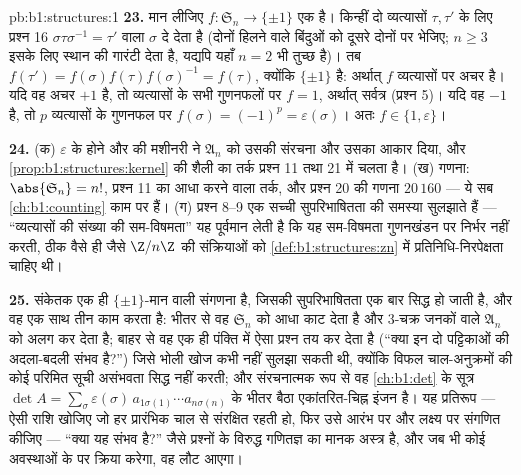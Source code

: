 \begin{solution}{pb:b1:structures:1}
\textbf{23.} मान लीजिए $f \colon \mathfrak S_n \to \{\pm1\}$ एक 
है। किन्हीं दो व्यत्यासों $\tau, \tau'$ के लिए प्रश्न 16
$\sigma\tau\sigma^{-1} = \tau'$ वाला $\sigma$ दे देता है (दोनों हिलने वाले
बिंदुओं को दूसरे दोनों पर भेजिए; $n \geq 3$ इसके लिए स्थान की गारंटी देता
है, यद्यपि यहाँ $n = 2$ भी तुच्छ है)। तब $f(\tau') =
f(\sigma)f(\tau)f(\sigma)^{-1} = f(\tau)$, क्योंकि $\{\pm1\}$  है:
अर्थात् $f$ व्यत्यासों पर अचर है। यदि वह अचर $+1$ है, तो व्यत्यासों के सभी
गुणनफलों पर $f = 1$, अर्थात् सर्वत्र (प्रश्न 5)। यदि वह $-1$ है, तो $p$
व्यत्यासों के गुणनफल पर $f(\sigma) = (-1)^p = \varepsilon(\sigma)$। अतः $f
\in \{1, \varepsilon\}$।

\textbf{24.} (क) $\varepsilon$ के  होने और  की मशीनरी ने
$\mathfrak A_n$ को उसकी  संरचना और उसका आकार दिया, और
\cref{prop:b1:structures:kernel} की शैली का तर्क प्रश्न 11 तथा 21 में चलता
है। (ख) गणना: $\abs{\mathfrak S_n} = n!$, प्रश्न 11 का आधा करने वाला तर्क,
और प्रश्न 20 की गणना $20\,160$ --- ये सब \cref{ch:b1:counting} काम पर हैं।
(ग) प्रश्न 8--9 एक सच्ची सुपरिभाषितता की समस्या सुलझाते हैं --- ``व्यत्यासों
की संख्या की सम-विषमता'' यह पूर्वमान लेती है कि यह सम-विषमता गुणनखंडन पर
निर्भर नहीं करती, ठीक वैसे ही जैसे $\Z/n\Z$ की संक्रियाओं को
\cref{def:b1:structures:zn} में प्रतिनिधि-निरपेक्षता चाहिए थी।

\textbf{25.} संकेतक एक ही $\{\pm1\}$-मान वाली संगणना है, जिसकी सुपरिभाषितता
एक बार सिद्ध हो जाती है, और वह एक साथ तीन काम करता है: भीतर से वह $\mathfrak
S_n$ को आधा काट देता है और $3$-चक्र जनकों वाले $\mathfrak A_n$ को अलग कर
देता है; बाहर से वह एक ही पंक्ति में ऐसा प्रश्न तय कर देता है (``क्या इन दो
पट्टिकाओं की अदला-बदली संभव है?'') जिसे भोली खोज कभी नहीं सुलझा सकती थी,
क्योंकि विफल चाल-अनुक्रमों की कोई परिमित सूची असंभवता सिद्ध नहीं करती; और
संरचनात्मक रूप से वह \cref{ch:b1:det} के सूत्र $\det A = \sum_\sigma
\varepsilon(\sigma)\, a_{1\sigma(1)}\cdots a_{n\sigma(n)}$ के भीतर बैठा
एकांतरित-चिह्न इंजन है। यह प्रतिरूप --- ऐसी राशि खोजिए जो हर प्रारंभिक चाल
से संरक्षित रहती हो, फिर उसे आरंभ पर और लक्ष्य पर संगणित कीजिए --- ``क्या यह
संभव है?'' जैसे प्रश्नों के विरुद्ध गणितज्ञ का मानक अस्त्र है, और जब भी कोई
 अवस्थाओं के  पर क्रिया करेगा, वह लौट आएगा।
\end{solution}

